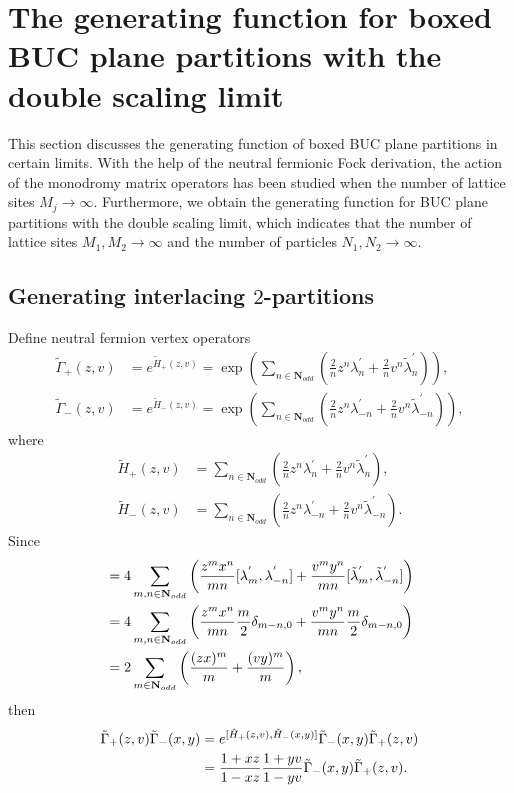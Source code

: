 \documentclass[11pt,reqno]{amsart}
\numberwithin{equation}{section}
\begin{document}
	
	
	\section{The generating function for boxed BUC plane partitions with the double scaling limit}
	
	This section discusses the generating function of boxed BUC plane partitions
	in certain limits.
	With the help of the neutral fermionic Fock derivation, the action of the monodromy matrix operators has been studied
	when the number of lattice sites $M_{j}\to \infty$.
	Furthermore, we obtain the generating function for BUC plane partitions with the double scaling limit, which  indicates
	that the number of lattice sites $M_{1},M_{2} \to \infty$ and the number of particles $N_{1},N_{2} \to \infty$.
	\subsection{Generating interlacing $2$-partitions}
	Define neutral fermion vertex operators
	\begin{align}\label{UCH}
		\tilde{\Gamma}_+(z,v) &= e^{\tilde{H}_{+}(z,v)}=
		\exp\left( \sum\limits_{n\in\mathbf{N}_{odd}}
		\left(\frac{2}{n}z^n \lambda_{n}^{'} + \frac{2}{n} v^n \tilde{\lambda}^{'}_{n} \right)\right), \\
		\tilde{\Gamma}_-(z,v) &=  e^{\tilde{H}_{-}(z,v)}=
		\exp\left(  \sum\limits_{n\in\mathbf{N}_{odd}}  \left(\frac{2}{n}z^n \lambda_{-n}^{'} + \frac{2}{n} v^n\tilde{\lambda}^{'}_{-n} \right) \right),
	\end{align}
	where
	\begin{align}
		\tilde{H}_{+}(z,v)&=\sum\limits_{n\in\mathbf{N}_{odd}}
		\left(\frac{2}{n}z^n \lambda_{n}^{'} + \frac{2}{n} v^n \tilde{\lambda}^{'}_{n} \right),\label{BUCH+}\\
		\tilde{H}_{-}(z,v)&= \sum\limits_{n\in\mathbf{N}_{odd}}  \left(\frac{2}{n}z^n \lambda_{-n}^{'} + \frac{2}{n} v^n\tilde{\lambda}^{'}_{-n} \right).\label{BUCH-}
	\end{align}
	Since
	\begin{align}
		[\tilde{H}_{+}(z,v),\tilde{H}_{-}(x,y)]
		&=4
		\sum\limits_{m,n\in\mathbf{N}_{odd}}   \left(\frac{z^{m}x^{n}}{mn}[\lambda_{m}^{'},\lambda_{-n}^{'}]
		+  \frac{v^{m}y^{n}}{mn}[\tilde{\lambda}^{'}_{m},\tilde{\lambda}^{'}_{-n}]\right) \notag\\
		&=4
		\sum\limits_{m,n\in\mathbf{N}_{odd}}
		\left(\frac{z^{m}x^{n}}{mn} \frac{m}{2} \delta_{m-n,0}
		+  \frac{v^{m}y^{n}}{mn}\frac{m}{2} \delta_{m-n,0}\right)
		\notag\\
		&=2\sum\limits_{m\in\mathbf{N}_{odd}}
		\left(\frac{(zx)^{m}}{m} + \frac{(vy)^{m}}{m}\right),
	\end{align}
	then
	\begin{align}\label{Gamme-commutation-relations}
		\tilde{\Gamma}_+(z,v) \tilde{\Gamma}_-(x,y)&=e^{[\tilde{H}_{+}(z,v),\tilde{H}_{-}(x,y)]} \tilde{\Gamma}_-(x,y)\tilde{\Gamma}_+(z,v)\notag\\
		&=\frac{1+xz}{1-xz} \frac{1+yv}{1-yv}   \tilde{\Gamma}_-(x,y)\tilde{\Gamma}_+(z,v).
	\end{align}
	
\end{document}
